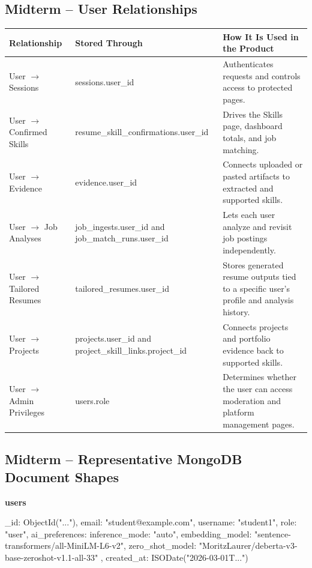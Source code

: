 \documentclass[11pt]{article}
\begin{document}
\subsection*{Midterm -- User Relationships}

\begin{table}[H]
  \renewcommand{\arraystretch}{1.2}
  \begin{tabularx}{\linewidth}{@{}p{1.7in}YY@{}}
    \toprule
    \textbf{Relationship} & \textbf{Stored Through} & \textbf{How It Is Used in the Product} \\
    \midrule
    User $\rightarrow$ Sessions & sessions.user\_id & Authenticates requests and controls access to protected pages. \\
    User $\rightarrow$ Confirmed Skills & resume\_skill\_confirmations.user\_id & Drives the Skills page, dashboard totals, and job matching. \\
    User $\rightarrow$ Evidence & evidence.user\_id & Connects uploaded or pasted artifacts to extracted and supported skills. \\
    User $\rightarrow$ Job Analyses & job\_ingests.user\_id and job\_match\_runs.user\_id & Lets each user analyze and revisit job postings independently. \\
    User $\rightarrow$ Tailored Resumes & tailored\_resumes.user\_id & Stores generated resume outputs tied to a specific user's profile and analysis history. \\
    User $\rightarrow$ Projects & projects.user\_id and project\_skill\_links.project\_id & Connects projects and portfolio evidence back to supported skills. \\
    User $\rightarrow$ Admin Privileges & users.role & Determines whether the user can access moderation and platform management pages. \\
    \bottomrule
  \end{tabularx}
\end{table}

\subsection*{Midterm -- Representative MongoDB Document Shapes}

\noindent
\textbf{users}
\begin{TerminalBlock}
{
  _id: ObjectId("..."),
  email: "student@example.com",
  username: "student1",
  role: "user",
  ai_preferences: {
    inference_mode: "auto",
    embedding_model: "sentence-transformers/all-MiniLM-L6-v2",
    zero_shot_model: "MoritzLaurer/deberta-v3-base-zeroshot-v1.1-all-33"
  },
  created_at: ISODate("2026-03-01T...")
}
\end{TerminalBlock}
\end{document}
